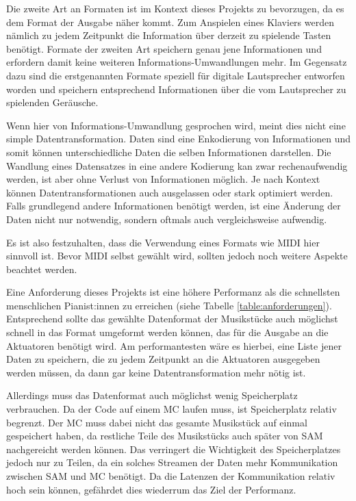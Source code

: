 Die zweite Art an Formaten ist im Kontext dieses Projekts zu bevorzugen, da es dem Format der Ausgabe näher kommt.
Zum Anspielen eines Klaviers werden nämlich zu jedem Zeitpunkt die Information über derzeit zu spielende Tasten benötigt.
Formate der zweiten Art speichern genau jene Informationen und erfordern damit keine weiteren Informations-Umwandlungen mehr. \newline
Im Gegensatz dazu sind die erstgenannten Formate speziell für digitale Lautsprecher entworfen worden und speichern entsprechend Informationen über die vom Lautsprecher zu spielenden Geräusche.

Wenn hier von Informations-Umwandlung gesprochen wird, meint dies nicht eine simple Datentransformation.
Daten sind eine Enkodierung von Informationen und somit können unterschiedliche Daten die selben Informationen darstellen.
Die Wandlung eines Datensatzes in eine andere Kodierung kan zwar rechenaufwendig werden, ist aber ohne Verlust von Informationen möglich.
Je nach Kontext können Datentransformationen auch ausgelassen oder stark optimiert werden.
Falls grundlegend andere Informationen benötigt werden, ist eine Änderung der Daten nicht nur notwendig, sondern oftmals auch vergleichsweise aufwendig.

Es ist also festzuhalten, dass die Verwendung eines Formats wie \ac{MIDI} hier sinnvoll ist.
Bevor \ac{MIDI} selbst gewählt wird, sollten jedoch noch weitere Aspekte beachtet werden.

Eine Anforderung dieses Projekts ist eine höhere Performanz als die schnellsten menschlichen Pianist:innen zu erreichen (siehe Tabelle \ref{table:anforderungen}).
Entsprechend sollte das gewählte Datenformat der Musikstücke auch möglichst schnell in das Format umgeformt werden können, das für die Ausgabe an die Aktuatoren benötigt wird.
Am performantesten wäre es hierbei, eine Liste jener Daten zu speichern, die zu jedem Zeitpunkt an die Aktuatoren ausgegeben werden müssen, da dann gar keine Datentransformation mehr nötig ist.

Allerdings muss das Datenformat auch möglichst wenig Speicherplatz verbrauchen.
Da der Code auf einem \ac{MC} laufen muss, ist Speicherplatz relativ begrenzt.
Der \ac{MC} muss dabei nicht das gesamte Musikstück auf einmal gespeichert haben, da restliche Teile des Musikstücks auch später von \ac{SAM} nachgereicht werden können.
Das verringert die Wichtigkeit des Speicherplatzes jedoch nur zu Teilen, da ein solches Streamen der Daten mehr Kommunikation zwischen \ac{SAM} und {MC} benötigt.
Da die Latenzen der Kommunikation relativ hoch sein können, gefährdet dies wiederrum das Ziel der Performanz.

